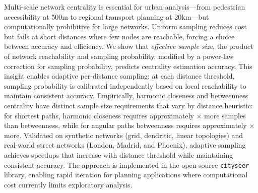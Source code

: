 
Multi-scale network centrality is essential for urban analysis---from pedestrian accessibility at 500m to regional transport planning at 20km---but computationally prohibitive for large networks. Uniform sampling reduces cost but fails at short distances where few nodes are reachable, forcing a choice between accuracy and efficiency. We show that \emph{effective sample size}, the product of network reachability and sampling probability, modified by a power-law correction for sampling probability, predicts centrality estimation accuracy. This insight enables adaptive per-distance sampling: at each distance threshold, sampling probability is calibrated independently based on local reachability to maintain consistent accuracy. Empirically, harmonic closeness and betweenness centrality have distinct sample size requirements that vary by distance heuristic: for shortest paths, harmonic closeness requires approximately \ratioHBShortest$\times$ more samples than betweenness, while for angular paths betweenness requires approximately \ratioBHAngular$\times$ more. Validated on synthetic networks (grid, dendritic, linear topologies) and real-world street networks (London, Madrid, and Phoenix), adaptive sampling achieves speedups that increase with distance threshold while maintaining consistent accuracy. The approach is implemented in the open-source \texttt{cityseer} library, enabling rapid iteration for planning applications where computational cost currently limits exploratory analysis.
